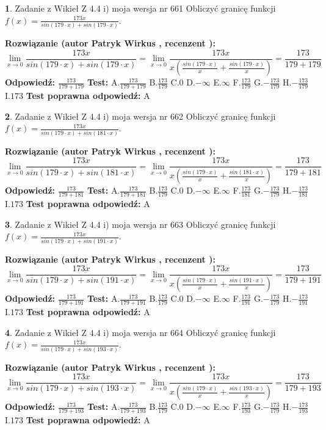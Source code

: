 \documentclass[12pt, a4paper]{article}
\theoremstyle{definition} %
\newtheorem{zad}{}
\newcommand{\zadStart}[1]{\begin{zad}#1\newline}
\newcommand{\zadStop}{\end{zad}}
\newcommand{\rozwStart}[2]{\noindent \textbf{Rozwiązanie (autor #1 , recenzent #2): }\newline}
\newcommand{\rozwStop}{\newline}
\newcommand{\odpStart}{\noindent \textbf{Odpowiedź:}\newline}
\newcommand{\odpStop}{\newline}
\newcommand{\testStart}{\noindent \textbf{Test:}\newline}
\newcommand{\testStop}{\newline}
\newcommand{\kluczStart}{\noindent \textbf{Test poprawna odpowiedź:}\newline}
\newcommand{\kluczStop}{\newline}
\begin{document}
\zadStart{Zadanie z Wikieł Z 4.4 i) moja wersja nr 661}
Obliczyć granicę funkcji $f(x)=\frac{173x}{sin(179\cdot x) +sin(179\cdot x)}$.
\zadStop
\rozwStart{Patryk Wirkus}{}
$$\lim\limits_{x\to 0}\frac{173x}{sin(179\cdot x) +sin(179\cdot x)}=\lim\limits_{x\to 0}\frac{173x}{x(\frac{sin(179\cdot x)}{x}+\frac{sin(179\cdot x)}{x})}=\frac{173}{179+179}$$
\rozwStop
\odpStart
$\frac{173}{179+179}$
\odpStop
\testStart
A.$\frac{173}{179+179}$
B.$\frac{173}{179}$
C.$0$
D.$-\infty$
E.$\infty$
F.$\frac{173}{179}$
G.$-\frac{173}{179}$
H.$-\frac{173}{179}$
I.$173$
\testStop
\kluczStart
A
\kluczStop



\zadStart{Zadanie z Wikieł Z 4.4 i) moja wersja nr 662}
Obliczyć granicę funkcji $f(x)=\frac{173x}{sin(179\cdot x) +sin(181\cdot x)}$.
\zadStop
\rozwStart{Patryk Wirkus}{}
$$\lim\limits_{x\to 0}\frac{173x}{sin(179\cdot x) +sin(181\cdot x)}=\lim\limits_{x\to 0}\frac{173x}{x(\frac{sin(179\cdot x)}{x}+\frac{sin(181\cdot x)}{x})}=\frac{173}{179+181}$$
\rozwStop
\odpStart
$\frac{173}{179+181}$
\odpStop
\testStart
A.$\frac{173}{179+181}$
B.$\frac{173}{179}$
C.$0$
D.$-\infty$
E.$\infty$
F.$\frac{173}{181}$
G.$-\frac{173}{179}$
H.$-\frac{173}{181}$
I.$173$
\testStop
\kluczStart
A
\kluczStop



\zadStart{Zadanie z Wikieł Z 4.4 i) moja wersja nr 663}
Obliczyć granicę funkcji $f(x)=\frac{173x}{sin(179\cdot x) +sin(191\cdot x)}$.
\zadStop
\rozwStart{Patryk Wirkus}{}
$$\lim\limits_{x\to 0}\frac{173x}{sin(179\cdot x) +sin(191\cdot x)}=\lim\limits_{x\to 0}\frac{173x}{x(\frac{sin(179\cdot x)}{x}+\frac{sin(191\cdot x)}{x})}=\frac{173}{179+191}$$
\rozwStop
\odpStart
$\frac{173}{179+191}$
\odpStop
\testStart
A.$\frac{173}{179+191}$
B.$\frac{173}{179}$
C.$0$
D.$-\infty$
E.$\infty$
F.$\frac{173}{191}$
G.$-\frac{173}{179}$
H.$-\frac{173}{191}$
I.$173$
\testStop
\kluczStart
A
\kluczStop



\zadStart{Zadanie z Wikieł Z 4.4 i) moja wersja nr 664}
Obliczyć granicę funkcji $f(x)=\frac{173x}{sin(179\cdot x) +sin(193\cdot x)}$.
\zadStop
\rozwStart{Patryk Wirkus}{}
$$\lim\limits_{x\to 0}\frac{173x}{sin(179\cdot x) +sin(193\cdot x)}=\lim\limits_{x\to 0}\frac{173x}{x(\frac{sin(179\cdot x)}{x}+\frac{sin(193\cdot x)}{x})}=\frac{173}{179+193}$$
\rozwStop
\odpStart
$\frac{173}{179+193}$
\odpStop
\testStart
A.$\frac{173}{179+193}$
B.$\frac{173}{179}$
C.$0$
D.$-\infty$
E.$\infty$
F.$\frac{173}{193}$
G.$-\frac{173}{179}$
H.$-\frac{173}{193}$
I.$173$
\testStop
\kluczStart
A
\kluczStop
\end{document}

